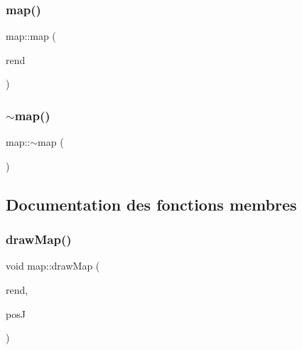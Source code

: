 \mbox{\label{classmap_ac9ca42e594534695586ba202a7e802da}} 
\subsubsection{\texorpdfstring{map()}{map()}\hspace{0.1cm}{\footnotesize\ttfamily [2/2]}}
{\footnotesize\ttfamily map\+::map (\begin{DoxyParamCaption}\item[{S\+D\+L\+\_\+\+Renderer $\ast$}]{rend }\end{DoxyParamCaption})}

\mbox{\label{classmap_a0cc22df7b44f7835fa10ed241848b041}} 
\subsubsection{\texorpdfstring{$\sim$map()}{~map()}}
{\footnotesize\ttfamily map\+::$\sim$map (\begin{DoxyParamCaption}{ }\end{DoxyParamCaption})}



\subsection{Documentation des fonctions membres}
\mbox{\label{classmap_a5ecdf2c5927ddbe3fffb9079fbd3e915}} 
\subsubsection{\texorpdfstring{draw\+Map()}{drawMap()}}
{\footnotesize\ttfamily void map\+::draw\+Map (\begin{DoxyParamCaption}\item[{S\+D\+L\+\_\+\+Renderer $\ast$}]{rend,  }\item[{const \hyperlink{classComplex}{Complex} \&}]{posJ }\end{DoxyParamCaption})}

\mbox{\label{classmap_ad2606d243008ce663393b272d01e1463}} 
